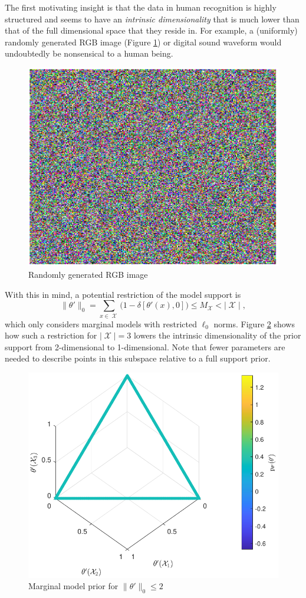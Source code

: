 \documentclass[12pt]{article}
\DeclareMathOperator{\Xcal}{\mathcal{X}}
\begin{document}
The first motivating insight is that the data in human recognition is highly structured and seems to have an \emph{intrinsic dimensionality} that is much lower than that of the full dimensional space that they reside in. For example, a (uniformly) randomly generated RGB image (Figure \ref{fig:RGB_random}) or digital sound waveform would undoubtedly be nonsensical to a human being. 
\begin{figure}
\centering
\includegraphics[width=0.5\linewidth]{RGB_random.pdf}
\caption{Randomly generated RGB image}
\label{fig:RGB_random}
\end{figure}
With this in mind, a potential restriction of the model support is
\begin{equation}
\big\| \theta' \big\|_0 = \sum_{x \in \Xcal} \Big(1 - \delta[\theta'(x),0] \Big) \leq M_{\Xcal} < |\Xcal| \;,
\end{equation}
which only considers marginal models with restricted $\ell_0$ norms. Figure \ref{fig:P_theta_limited_obs} shows how such a restriction for $|\Xcal| = 3$ lowers the intrinsic dimensionality of the prior support from 2-dimensional to 1-dimensional. Note that fewer parameters are needed to describe points in this subspace relative to a full support prior.
\begin{figure}
\centering
\includegraphics[width=0.6\linewidth]{P_theta_limited_obs.pdf}
\caption{Marginal model prior for $\big\| \theta' \big\|_0 \leq 2$}
\label{fig:P_theta_limited_obs}
\end{figure}
\end{document}
